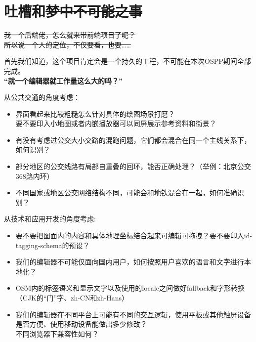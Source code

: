 \documentclass{beamer}
\begin{document}
\section{吐槽和\sout{梦中不可能之事}}

\begin{frame}
    \Large
    \sout{我一个后端佬，怎么就来带前端项目了呢？}\\
    \sout{所以说一个人的定位，不仅要看，也要……}
\end{frame}

\begin{frame}
    \large
    \quad \quad 首先我们知道，这个项目肯定会是一个持久的工程，不可能在本次OSPP期间全部完成。\\
    \vspace{4em}
    \quad \quad \textbf{“就一个编辑器就工作量这么大的吗？”}
\end{frame}


\begin{frame}
    \Large
    从公共交通的角度考虑：\\
    \normalsize
    \begin{itemize}
        \item 界面看起来比较粗糙怎么针对具体的绘图场景打磨？\\
        要不要印入小地图或者内嵌播放器可以同屏展示参考资料和街景？
        \item  有没有考虑过公交大小交路的混跑问题，它们都会混合在同一个主线关系下，如何识别？
        \item 部分地区的公交线路有局部自重叠的回环，能否正确处理？（举例：北京公交368路内环）
        \item 不同国家或地区公交网络结构不同，可能会和地铁混合在一起，如何准确识别？
    \end{itemize}
    
\end{frame}

\begin{frame}
    \Large
    从技术和应用开发的角度考虑: \\
    \normalsize
    \begin{itemize}
        \item 要不要把图面内的内容和具体地理坐标结合起来可编辑可拖拽？要不要印入id-tagging-schema的预设？
        \item 我们的编辑器不可能仅面向国内用户，如何按照用户喜欢的语言和文字进行本地化？
        \item OSM内的标签语义和显示文字以及使用的locale之间做好fallback和字形转换（CJK的“门”字、zh-CN和zh-Hans）
        \item 我们的编辑器在不同平台上可能有不同的交互逻辑，使用平板或其他触屏设备是否方便、使用移动设备能做出多少修改？\\
              不同浏览器下兼容性如何？
    \end{itemize}
\end{frame}
\end{document}
